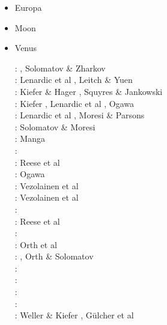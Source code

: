 \begin{itemize}
\item Europa 
{\scriptsize
\cite{shha04,shha05,mish05,hash08}\cite{hash10}\cite{hash11,kast14,almc19}
}
\item Moon 
{\scriptsize
\cite{elvh02}\cite{elhg04}\cite{devv10}\cite{dejv13} \cite{zhdv19}
} 
\item Venus 
\begin{scriptsize}
\nineteenninety: \cite{scbg90}, Solomatov \& Zharkov \cite{sozh90}\\
\nineteenninetyone: Lenardic et al \cite{lekb91}, Leitch \& Yuen \cite{leyu91}\\
\nineteenninetytwo: Kiefer \& Hager \cite{kiha92}, Squyres \& Jankowski \cite{sqjs92}\\
\nineteenninetythree: Kiefer \cite{kief93}, Lenardic et al \cite{lekb93}, Ogawa \cite{ogaw93}\\ 
\nineteenninetyfive: Lenardic et al \cite{lekb95}, Moresi \& Parsons \cite{mopa95}\\
\nineteenninetysix: Solomatov \& Moresi \cite{somo96}\\
\nineteenninetyseven: Manga \cite{mang97} \\
\nineteenninetyeight: \cite{mazk98}\cite{resm98}\cite{moso98}\cite{phha98}\\
\nineteenninetynine: Reese et al \cite{resm99}\\
\twothousand: Ogawa \cite{ogaw00} \\
\twothousandthree: Vezolainen et al \cite{vesh03}\\
\twothousandfour: Vezolainen et al \cite{vesb04}\\
\twothousandfive: \cite{vavv05}\\
\twothousandseven: Reese et al \cite{reso07}\\
\twothousandten: \cite{stfh10}\\
\twothousandeleven: Orth et al \cite{orso11}\\
\twothousandtwelve: \cite{arta12}, Orth \& Solomatov \cite{orso12}\\
\twothousandthirteen: \cite{huyz13}\\
\twothousandfourteen: \cite{gita14}\cite{gery14b}\\
\twothousandseventeen: \cite{cram17}\cite{dast17}\\
\twothousandeighteen: \cite{king18}\\
\twothousandtwenty: Weller \& Kiefer \cite{weki20}, G{\"u}lcher et al \cite{gugm20}
\end{scriptsize}


\end{itemize}
